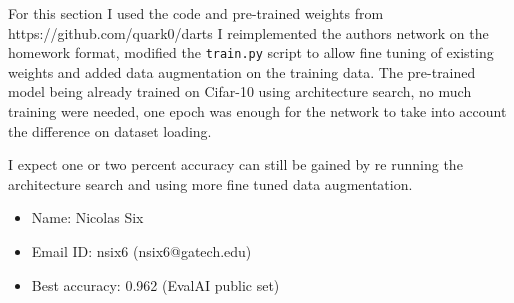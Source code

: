 
For this section I used the code and pre-trained weights from
https://github.com/quark0/darts I reimplemented the authors network on
the homework format, modified the \texttt{train.py} script to allow fine
tuning of existing weights and added data augmentation on the training
data. The pre-trained model being already trained on Cifar-10 using
architecture search, no much training were needed, one epoch was enough
for the network to take into account the difference on dataset loading.

I expect one or two percent accuracy can still be gained by re running
the architecture search and using more fine tuned data augmentation.

\begin{itemize}
\item
  Name: Nicolas Six
\item
  Email ID: nsix6 (nsix6@gatech.edu)
\item
  Best accuracy: 0.962 (EvalAI public set)
\end{itemize}

